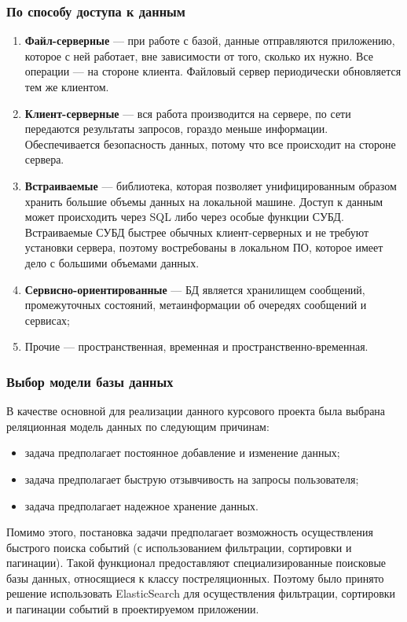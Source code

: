 \subsubsection{По способу доступа к данным}

\begin{enumerate}[label=\arabic*.]
	\item \textbf{Файл-серверные} --- при работе с базой, данные отправляются приложению, которое с ней работает, вне зависимости от того, сколько их нужно. Все операции --- на стороне клиента. Файловый сервер периодически обновляется тем же клиентом.
	\item \textbf{Клиент-серверные} --- вся работа производится на сервере, по сети передаются результаты запросов, гораздо меньше информации. Обеспечивается безопасность данных, потому что все происходит на стороне сервера.
	\item \textbf{Встраиваемые} --- библиотека, которая позволяет унифицированным образом хранить большие объемы данных на локальной машине. Доступ к данным может происходить через SQL либо через особые функции СУБД. Встраиваемые СУБД быстрее обычных клиент-серверных и не требуют установки сервера, поэтому востребованы в локальном ПО, которое имеет дело с большими объемами данных.
	\item \textbf{Сервисно-ориентированные} --- БД является хранилищем сообщений, промежуточных состояний, метаинформации об очередях сообщений и сервисах;
	\item Прочие --- пространственная, временная и пространственно-временная.
\end{enumerate}


\subsubsection{Выбор модели базы данных}

В качестве основной для реализации данного курсового проекта была выбрана реляционная модель данных по следующим причинам:

\begin{itemize}[]
	\item задача предполагает постоянное добавление и изменение данных;
	\item задача предполагает быструю отзывчивость на запросы пользователя;
	\item задача предполагает надежное хранение данных.
\end{itemize}
 
Помимо этого, постановка задачи предполагает возможность осуществления быстрого поиска событий (с использованием фильтрации, сортировки и пагинации). Такой функционал предоставляют специализированные поисковые базы данных, относящиеся к классу постреляционных. Поэтому было принято решение использовать ElasticSearch для осуществления фильтрации, сортировки и пагинации событий в проектируемом приложении.

